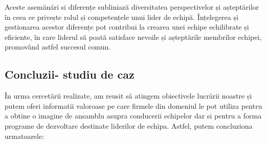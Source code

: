 \documentclass[a4paper, 12pt]{article}
\begin{document}
\begin{enumerate}[A)]
\begin{enumerate}[(1)]
\begin{itemize}
\end{itemize}
	\quad Aceste asemănări si diferențe subliniază diversitatea perspectivelor și așteptărilor în ceea ce privește rolul și competențele unui lider de echipă. Înțelegerea și gestionarea acestor diferențe pot contribui la crearea unei echipe echilibrate și eficiente, în care liderul să poată satisface nevoile și așteptările membrilor echipei, promovând astfel succesul comun.
\end{enumerate}
	\end{enumerate}

	\subsection{ Concluzii- studiu de caz} 

	\quad În urma cercetării realizate, am reusit să atingem obiectivele lucrării noastre și putem oferi informatii valoroase pe care firmele din domeniul le pot utiliza pentru a obtine o imagine de ansamblu asupra conducerii echipelor dar si pentru a forma programe de dezvoltare destinate liderilor de echipa. Astfel, putem concluziona urmatoarele:
\end{document}
